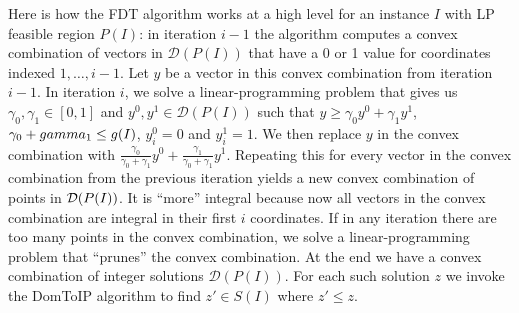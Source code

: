 
Here is how the FDT algorithm works at a high level for an instance $I$ with LP feasible region $P(I)$: in iteration $i-1$ the algorithm computes a convex combination of vectors in $\mathcal{D}(P(I))$ that have a 0 or 1 value for coordinates indexed $1,\ldots,i-1$. Let $y$ be a vector in this convex combination from iteration $i-1$. In iteration $i$, we solve a linear-programming problem that gives us $\gamma_0,\gamma_1\in [0,1]$ and $y^0,y^1\in \mathcal{D}(P(I))$ such that $y\geq \gamma_0 y^0 + \gamma_1 y^1$, $\gamma_0+\\gamma_1\leq g(I)$, $y^0_i=0$ and $y^1_i=1$. We then replace $y$ in the convex combination with $\frac{\gamma_0}{\gamma_0+\gamma_1}y^0 +\frac{\gamma_1}{\gamma_0+\gamma_1}y^1$.  Repeating this for every vector in the convex combination from the previous iteration yields a new convex combination of points in $\operatorname{\mathcal{D}}(P(I))$. It is ``more'' integral because now all vectors in the convex combination are integral in their first $i$ coordinates. If in any iteration there are too many points in the convex combination,  we solve a linear-programming problem that ``prunes'' the convex combination. At the end we have a convex combination of integer solutions $\mathcal{D}(P(I))$. For each such solution $z$ we invoke the DomToIP algorithm
to find $z'\in S(I)$ where $z'\leq z$.


